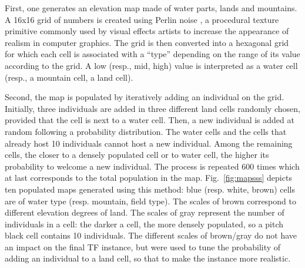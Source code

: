 \documentclass[conference]{IEEEtran}
\theoremstyle{definition}
\begin{document}
First, one generates an elevation map made of water parts, lands and mountains. 
A 16x16 grid of numbers is created using
Perlin noise \cite{perlin}, a procedural texture primitive commonly used by visual 
effects artists to increase the appearance of realism in
computer graphics. The grid is then converted into a hexagonal grid for which each cell is associated with
a ``type'' depending on the range of its value according to the grid.
A low (resp., mid, high) value is interpreted as a water cell (resp., a mountain cell, a land cell).

Second, the map is populated by iteratively adding an individual on the grid. 
Initially, three individuals are added in three different land cells randomly chosen,
provided that the cell is next to a water cell. Then, a new individual is added at 
random following a probability distribution.
The water cells and the cells that already host 10 individuals cannot host a new individual.
Among the remaining cells, the closer to a densely populated cell or to water cell,
the higher its probability to welcome a new individual.
The process is repeated 600 times which at last corresponds to the total 
population in the map.
Fig.~\ref{fig:mapsss} depicts ten populated maps
generated using
this method: blue (resp. white, brown) cells are of water type (resp. mountain, field type).
The scales of brown correspond to different elevation degrees of land.
The scales of gray represent the number of individuals in a cell: the darker a cell,
the more densely populated, so a pitch black cell contains 10 individuals.
The different scales of brown/gray do not have an impact on the final TF instance, but were
used to tune the probability of adding an individual to a land cell, so that to make the instance more realistic.
\end{document}
